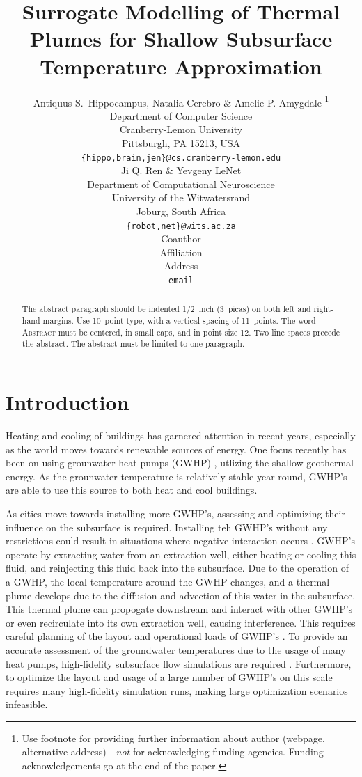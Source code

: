 \documentclass{article} %
\title{Surrogate Modelling of Thermal Plumes for Shallow Subsurface Temperature Approximation}
\author{Antiquus S.~Hippocampus, Natalia Cerebro \& Amelie P. Amygdale \thanks{ Use footnote for providing further information
about author (webpage, alternative address)---\emph{not} for acknowledging
funding agencies.  Funding acknowledgements go at the end of the paper.} \\
Department of Computer Science\\
Cranberry-Lemon University\\
Pittsburgh, PA 15213, USA \\
\texttt{\{hippo,brain,jen\}@cs.cranberry-lemon.edu} \\
\And
Ji Q. Ren \& Yevgeny LeNet \\
Department of Computational Neuroscience \\
University of the Witwatersrand \\
Joburg, South Africa \\
\texttt{\{robot,net\}@wits.ac.za} \\
\AND
Coauthor \\
Affiliation \\
Address \\
\texttt{email}
}
\begin{document}
\maketitle

\begin{abstract}
   The abstract paragraph should be indented 1/2~inch (3~picas) on both left and
   right-hand margins. Use 10~point type, with a vertical spacing of 11~points.
   The word \textsc{Abstract} must be centered, in small caps, and in point size 12. Two
   line spaces precede the abstract. The abstract must be limited to one
   paragraph.
\end{abstract}

\section{Introduction}
\label{sec:intro}

Heating and cooling of buildings has garnered attention in recent years, especially as the world moves towards renewable sources of energy. 
One focus recently has been on using grounwater heat pumps (GWHP) \cite{Halilovic2022}, utlizing the shallow geothermal energy. 
As the grounwater temperature is relatively stable year round, GWHP's are able to use this source to both heat and cool buildings. %

As cities move towards installing more GWHP's, assessing and optimizing their influence on the subsurface is required. 
Installing teh GWHP's without any restrictions could result in situations where negative interaction occurs \cite{Garcia2020, Daemi2019}. 
GWHP's operate by extracting water from an extraction well, either heating or cooling this fluid, and reinjecting this fluid back into the subsurface.  
Due to the operation of a GWHP, the local temperature around the GWHP changes, and a thermal plume develops due to the diffusion and advection of this water in the subsurface. 
This thermal plume can propogate downstream and interact with other GWHP's or even recirculate into its own extraction well, causing interference. 
This requires careful planning of the layout and operational loads of GWHP's \cite{Beck2013}. 
To provide an accurate assessment of the groundwater temperatures due to the usage of many heat pumps, high-fidelity subsurface flow simulations are required \cite{Meng2019}. 
Furthermore, to optimize the layout and usage of a large number of GWHP's on this scale requires many high-fidelity simulation runs, making large optimization scenarios infeasible.
\end{document}
